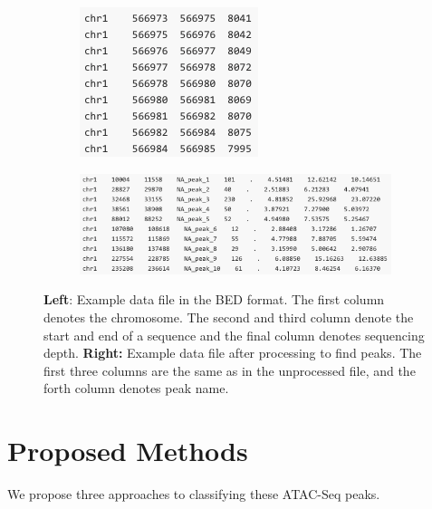 \documentclass{article}
\begin{document}
\begin{figure}[H]
  \centering
  \begin{subfigure}{0.25\textwidth}
    \includegraphics[width = \linewidth]{before_proc}
  \end{subfigure}%
  \hspace{10mm}%
  \begin{subfigure}{0.65\textwidth}
    \includegraphics[width = \linewidth]{after_proc}
  \end{subfigure}
  \label{BED_DATA}
  \caption{\textbf{Left}: Example data file in the BED format.  The first column denotes
  the chromosome.  The second and third column denote the start and end of a
  sequence and the final column denotes sequencing depth.  \textbf{Right:}
  Example data file after processing to find peaks.  The first three columns
  are the same as in the unprocessed file, and the forth column denotes peak name.}
\end{figure}


\section{Proposed Methods}
We propose three approaches to classifying these ATAC-Seq peaks.
\end{document}
